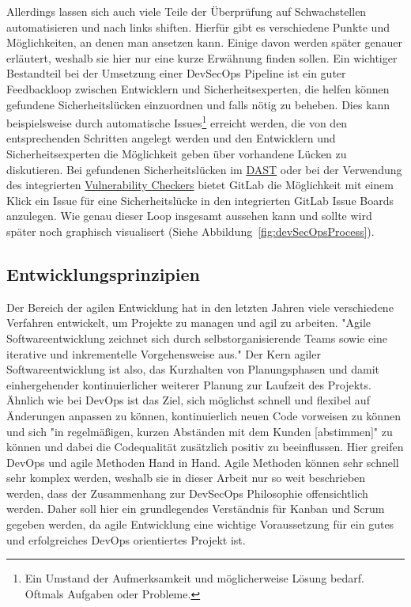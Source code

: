 Allerdings lassen sich auch viele Teile der Überprüfung auf Schwachstellen automatisieren und nach links shiften.
Hierfür gibt es verschiedene Punkte und Möglichkeiten, an denen man ansetzen kann.
Einige davon werden später genauer erläutert, weshalb sie hier nur eine kurze Erwähnung finden sollen.
Ein wichtiger Bestandteil bei der Umsetzung einer DevSecOps Pipeline ist ein guter Feedbackloop zwischen Entwicklern und Sicherheitsexperten, die helfen können gefundene Sicherheitslücken einzuordnen und falls nötig zu beheben.
Dies kann beispielsweise durch automatische Issues\footnote{Ein Umstand der Aufmerksamkeit und möglicherweise Lösung bedarf. Oftmals Aufgaben oder Probleme.} erreicht werden, die von den entsprechenden Schritten angelegt werden und den Entwicklern und Sicherheitsexperten die Möglichkeit geben über vorhandene Lücken zu diskutieren.
Bei gefundenen Sicherheitslücken im \hyperref[subsubsec:dast]{DAST} oder bei der Verwendung des integrierten \hyperref[subsubsec:vulChecker]{Vulnerability Checkers} bietet GitLab die Möglichkeit mit einem Klick ein Issue für eine Sicherheitslücke in den integrierten GitLab Issue Boards anzulegen.
Wie genau dieser Loop insgesamt aussehen kann und sollte wird später noch graphisch visualisert (Siehe Abbildung~\ref{fig:devSecOpsProcess}).

\subsection{Entwicklungsprinzipien}

Der Bereich der agilen Entwicklung hat in den letzten Jahren viele verschiedene Verfahren entwickelt, um Projekte zu managen und agil zu arbeiten.
"Agile Softwareentwicklung zeichnet sich durch selbstorganisierende Teams sowie eine iterative und inkrementelle Vorgehensweise aus."\cite{AgileSoftwareentwicklung2021}
Der Kern agiler Softwareentwicklung ist also, das Kurzhalten von Planungsphasen und damit einhergehender kontinuierlicher weiterer Planung zur Laufzeit des Projekts.
Ähnlich wie bei DevOps ist das Ziel, sich möglichst schnell und flexibel auf Änderungen anpassen zu können, kontinuierlich neuen Code vorweisen zu können und sich "in regelmäßigen, kurzen Abständen mit dem Kunden [abstimmen]"\cite{AgileSoftwareentwicklung2021} zu können und dabei die Codequalität zusätzlich positiv zu beeinflussen.
Hier greifen DevOps und agile Methoden Hand in Hand.
Agile Methoden können sehr schnell sehr komplex werden, weshalb sie in dieser Arbeit nur so weit beschrieben werden, dass der Zusammenhang zur DevSecOps Philosophie offensichtlich werden.
Daher soll hier ein grundlegendes Verständnis für Kanban und Scrum gegeben werden, da agile Entwicklung eine wichtige Voraussetzung für ein gutes und erfolgreiches DevOps orientiertes Projekt ist.

